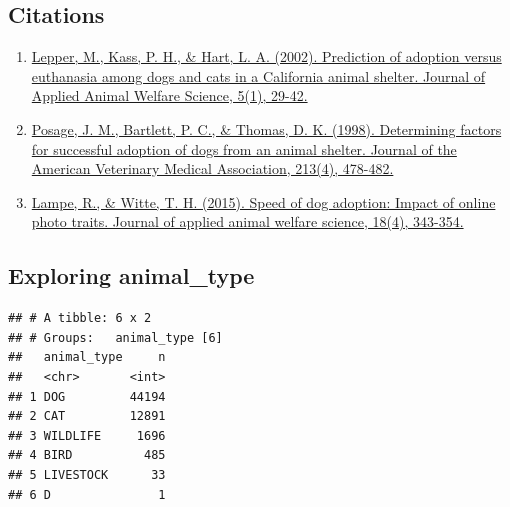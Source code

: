 \documentclass[]{article}
\newenvironment{Shaded}{\begin{snugshade}}{\end{snugshade}}
\newcommand{\KeywordTok}[1]{\textcolor[rgb]{0.13,0.29,0.53}{\textbf{#1}}}
\newcommand{\DataTypeTok}[1]{\textcolor[rgb]{0.13,0.29,0.53}{#1}}
\newcommand{\StringTok}[1]{\textcolor[rgb]{0.31,0.60,0.02}{#1}}
\newcommand{\CommentTok}[1]{\textcolor[rgb]{0.56,0.35,0.01}{\textit{#1}}}
\newcommand{\OtherTok}[1]{\textcolor[rgb]{0.56,0.35,0.01}{#1}}
\newcommand{\OperatorTok}[1]{\textcolor[rgb]{0.81,0.36,0.00}{\textbf{#1}}}
\newcommand{\NormalTok}[1]{#1}
\begin{document}
\subsection{Citations}\label{citations}

\begin{enumerate}
\def\labelenumi{\arabic{enumi}.}
\item
  \href{https://www.tandfonline.com/doi/abs/10.1207/S15327604JAWS0501_3}{Lepper,
  M., Kass, P. H., \& Hart, L. A. (2002). Prediction of adoption versus
  euthanasia among dogs and cats in a California animal shelter. Journal
  of Applied Animal Welfare Science, 5(1), 29-42.}
\item
  \href{https://europepmc.org/abstract/med/9713528}{Posage, J. M.,
  Bartlett, P. C., \& Thomas, D. K. (1998). Determining factors for
  successful adoption of dogs from an animal shelter. Journal of the
  American Veterinary Medical Association, 213(4), 478-482.}
\item
  \href{https://www.tandfonline.com/doi/abs/10.1080/10888705.2014.982796}{Lampe,
  R., \& Witte, T. H. (2015). Speed of dog adoption: Impact of online
  photo traits. Journal of applied animal welfare science, 18(4),
  343-354.}
\end{enumerate}

\subsection{Exploring animal\_type}\label{exploring-animal_type}

\begin{Shaded}
\end{Shaded}

\begin{verbatim}
## # A tibble: 6 x 2
## # Groups:   animal_type [6]
##   animal_type     n
##   <chr>       <int>
## 1 DOG         44194
## 2 CAT         12891
## 3 WILDLIFE     1696
## 4 BIRD          485
## 5 LIVESTOCK      33
## 6 D               1
\end{verbatim}

\begin{Shaded}
\end{Shaded}
\end{document}
